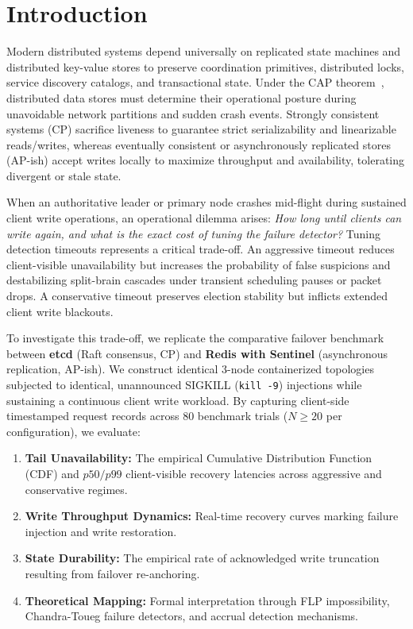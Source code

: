 \documentclass[conference]{IEEEtran}
\begin{document}
\section{Introduction}
Modern distributed systems depend universally on replicated state machines and distributed key-value stores to preserve coordination primitives, distributed locks, service discovery catalogs, and transactional state. Under the CAP theorem~\cite{brewer2012cap}, distributed data stores must determine their operational posture during unavoidable network partitions and sudden crash events. Strongly consistent systems (CP) sacrifice liveness to guarantee strict serializability and linearizable reads/writes, whereas eventually consistent or asynchronously replicated stores (AP-ish) accept writes locally to maximize throughput and availability, tolerating divergent or stale state.

When an authoritative leader or primary node crashes mid-flight during sustained client write operations, an operational dilemma arises: \textit{How long until clients can write again, and what is the exact cost of tuning the failure detector?} Tuning detection timeouts represents a critical trade-off. An aggressive timeout reduces client-visible unavailability but increases the probability of false suspicions and destabilizing split-brain cascades under transient scheduling pauses or packet drops. A conservative timeout preserves election stability but inflicts extended client write blackouts.

To investigate this trade-off, we replicate the comparative failover benchmark between \textbf{etcd} (Raft consensus, CP) and \textbf{Redis with Sentinel} (asynchronous replication, AP-ish). We construct identical 3-node containerized topologies subjected to identical, unannounced SIGKILL (\texttt{kill -9}) injections while sustaining a continuous client write workload. By capturing client-side timestamped request records across 80 benchmark trials ($N \ge 20$ per configuration), we evaluate:
\begin{enumerate}
    \item \textbf{Tail Unavailability:} The empirical Cumulative Distribution Function (CDF) and $p50/p99$ client-visible recovery latencies across aggressive and conservative regimes.
    \item \textbf{Write Throughput Dynamics:} Real-time recovery curves marking failure injection and write restoration.
    \item \textbf{State Durability:} The empirical rate of acknowledged write truncation resulting from failover re-anchoring.
    \item \textbf{Theoretical Mapping:} Formal interpretation through FLP impossibility, Chandra-Toueg failure detectors, and accrual detection mechanisms.
\end{enumerate}
\end{document}
